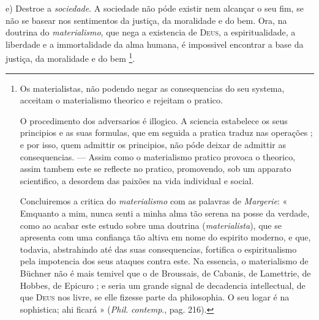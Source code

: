 e) Destroe a \emph{sociedade}. A sociedade não póde existir nem alcançar o seu fim, se não se basear nos sentimentos da justiça, da moralidade e do bem. Ora, na doutrina do \emph{materialismo},   que nega a existencia de \textsc{Deus}, a espiritualidade, a liberdade e a immortalidade da alma humana, é impossivel encontrar a base da justiça, da moralidade e do bem \footnote{Os materialistas, não podendo negar as consequencias do seu systema, acceitam o materialismo theorico e rejeitam o pratico.\par O procedimento dos adversarios é illogico. A sciencia estabelece os seus principios e as suas formulas, que em seguida a pratica traduz nas operações ; e por isso, quem admittir os principios, não póde deixar de admittir as consequencias. --- Assim como o materialismo pratico provoca o theorico, assim tambem este se reflecte no pratico, promovendo, sob um apparato scientifico, a desordem das paixões na vida individual e social.\par Concluiremos a critica do \emph{materialismo} com as palavras de \emph{Margerie}: « Emquanto a mim, nunca senti a minha alma tão serena na posse da verdade, como ao acabar este estudo sobre uma doutrina (\emph{materialista}), que se apresenta com uma confiança tão altiva em nome do espirito moderno, e que, todavia, abstrahindo até das suas consequencias, fortifica o espiritualismo pela impotencia dos seus ataques contra este. Na essencia, o materialismo de Büchner não é mais temivel que o de Broussais, de Cabanis, de Lamettrie, de Hobbes, de Epicuro ; e seria um grande signal de decadencia intellectual, de que \textsc{Deus} nos livre, se elle fizesse parte da philosophia. O seu logar é na sophistica; ahi ficará » (\emph{Phil}. \emph{contemp}., pag. 216).}.

   
